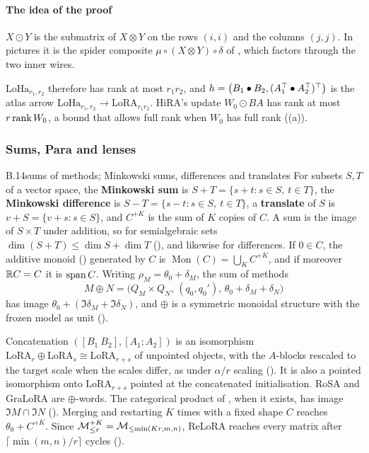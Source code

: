 \paragraph{The idea of the proof}
$X\odot Y$ is the submatrix of $X\otimes Y$ on the rows $(i,i)$ and the columns $(j,j)$. In pictures it is the spider
composite $\mu\circ(X\otimes Y)\circ\delta$ of , which factors through the two inner wires.

\medskip\noindent
$\mathrm{LoHa}_{r_1,r_2}$ therefore has rank at most $r_1r_2$, and $h=\big(B_1\bullet B_2,(A_1^{\top}\bullet A_2^{\top})^{\top}\big)$ is
the atlas arrow $\mathrm{LoHa}_{r_1,r_2}\to\mathrm{LoRA}_{r_1r_2}$. HiRA's update $W_0\odot BA$ has rank at most
$r\operatorname{rank} W_0$, a bound that allows full rank when $W_0$ has full rank ((a)).


\subsubsection*{Sums, Para and lenses}

\begin{bgentry}{B.14}{sums of methods; Minkowski sums, differences and translates}
For subsets $S,T$ of a vector space, the \textbf{Minkowski sum} is $S+T=\{s+t:s\in S,\ t\in T\}$, the
\textbf{Minkowski difference} is $S-T=\{s-t:s\in S,\ t\in T\}$, a \textbf{translate} of $S$ is $v+S=\{v+s:s\in S\}$,
and $C^{+K}$ is the sum of $K$ copies of $C$. A sum is the image of $S\times T$ under addition, so for semialgebraic sets
$\dim(S+T)\le\dim S+\dim T$ (), and likewise for differences. If $0\in C$, the additive monoid
() generated by $C$ is $\operatorname{Mon}(C)=\bigcup_KC^{+K}$, and if moreover $\mathbb{R} C=C$ it is
$\operatorname{span} C$. Writing $\rho_M=\theta_0+\delta_M$, the sum of methods
\begin{equation*}
  M\oplus N=\big(Q_M\times Q_N,\,(q_0,q_0'),\,\theta_0+\delta_M+\delta_N\big)
\end{equation*}
has image $\theta_0+(\Im\delta_M+\Im\delta_N)$, and $\oplus$ is a symmetric monoidal structure with the frozen model as
unit ().
\end{bgentry}

Concatenation $([B_1\ B_2],[A_1;A_2])$ is an isomorphism $\mathrm{LoRA}_r\oplus\mathrm{LoRA}_s\cong\mathrm{LoRA}_{r+s}$
of unpointed objects, with the $A$-blocks rescaled to the target scale when the scales differ, as under $\alpha/r$
scaling (). It is also a pointed isomorphism onto $\mathrm{LoRA}_{r+s}$ pointed at the
concatenated initialisation. RoSA \citep{nikdan2024rosa} and GraLoRA \citep{jung2025gralora} are $\oplus$-words. The
categorical product of , when it exists, has image $\Im M\cap\Im N$ (). Merging and
restarting $K$ times with a fixed shape $C$ reaches $\theta_0+C^{+K}$. Since
$\mathcal{M}_{\le r}^{+K}=\mathcal M_{\le\min(Kr,m,n)}$, ReLoRA reaches every matrix after $\lceil\min(m,n)/r\rceil$ cycles
().

